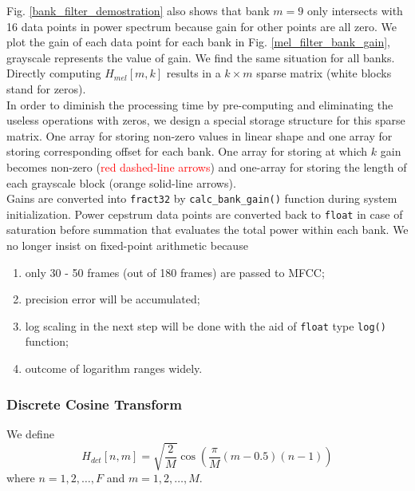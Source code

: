 Fig. \ref{bank_filter_demostration} also shows that bank $m=9$ only intersects with 16 data points in power spectrum because gain for other points are all zero. We plot the gain of each data point for each bank in Fig. \ref{mel_filter_bank_gain}, grayscale represents the value of gain. We find the same situation for all banks. Directly computing $H_{mel}[m, k]$ results in a $k \times m$ sparse matrix (white blocks stand for zeros).\\

In order to diminish the processing time by pre-computing and eliminating the useless operations with zeros, we design a special storage structure for this sparse matrix. One array for storing non-zero values in linear shape and one array for storing corresponding offset for each bank. One array for storing at which $k$ gain becomes non-zero (\textcolor{red}{red dashed-line arrows}) and one-array for storing the length of each grayscale block (\textcolor{orange_html}{orange solid-line arrows}).\\

Gains are converted into \texttt{fract32} by \texttt{calc\_bank\_gain()} function during system initialization. Power cepstrum data points are converted back to \texttt{float} in case of saturation before summation that evaluates the total power within each bank. We no longer insist on fixed-point arithmetic because
\begin{enumerate}
\item only 30 - 50 frames (out of 180 frames) are passed to MFCC;
\item precision error will be accumulated;
\item log scaling in the next step will be done with the aid of \texttt{float} type \texttt{log()} function;
\item outcome of logarithm ranges widely.
\end{enumerate}


\subsubsection{Discrete Cosine Transform}

We define
\begin{equation}
\label{eq:dct-coef}
H_{dct}[n, m] = \sqrt{\frac{2}{M}} \cos \left( \frac{\pi}{M} (m - 0.5) (n-1) \right)
\end{equation}
where $n = 1, 2, \dots, F$ and $m = 1, 2, \dots, M$.\\

